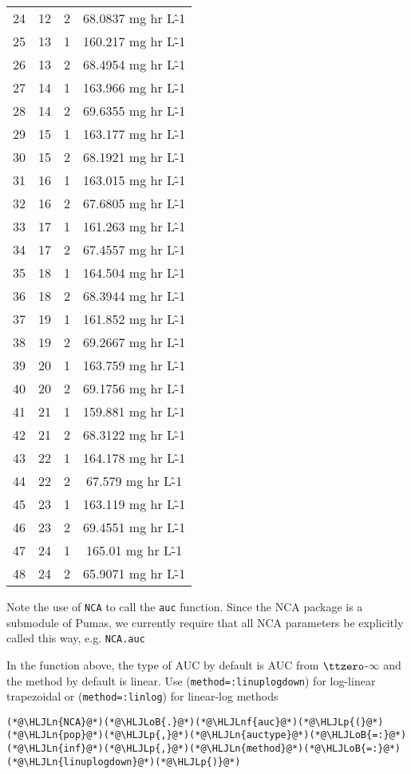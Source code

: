 \documentclass[12pt,a4paper]{article}
\newcommand{\HLJLn}[1]{#1}
\newcommand{\HLJLnf}[1]{\textcolor[RGB]{66,102,213}{#1}}
\newcommand{\HLJLoB}[1]{\textcolor[RGB]{102,102,102}{\textbf{#1}}}
\newcommand{\HLJLp}[1]{#1}
\begin{document}
\begin{tabular}{r|ccc}
	24 & 12 & 2 & 68.0837 mg hr L\^-1 \\
	25 & 13 & 1 & 160.217 mg hr L\^-1 \\
	26 & 13 & 2 & 68.4954 mg hr L\^-1 \\
	27 & 14 & 1 & 163.966 mg hr L\^-1 \\
	28 & 14 & 2 & 69.6355 mg hr L\^-1 \\
	29 & 15 & 1 & 163.177 mg hr L\^-1 \\
	30 & 15 & 2 & 68.1921 mg hr L\^-1 \\
	31 & 16 & 1 & 163.015 mg hr L\^-1 \\
	32 & 16 & 2 & 67.6805 mg hr L\^-1 \\
	33 & 17 & 1 & 161.263 mg hr L\^-1 \\
	34 & 17 & 2 & 67.4557 mg hr L\^-1 \\
	35 & 18 & 1 & 164.504 mg hr L\^-1 \\
	36 & 18 & 2 & 68.3944 mg hr L\^-1 \\
	37 & 19 & 1 & 161.852 mg hr L\^-1 \\
	38 & 19 & 2 & 69.2667 mg hr L\^-1 \\
	39 & 20 & 1 & 163.759 mg hr L\^-1 \\
	40 & 20 & 2 & 69.1756 mg hr L\^-1 \\
	41 & 21 & 1 & 159.881 mg hr L\^-1 \\
	42 & 21 & 2 & 68.3122 mg hr L\^-1 \\
	43 & 22 & 1 & 164.178 mg hr L\^-1 \\
	44 & 22 & 2 & 67.579 mg hr L\^-1 \\
	45 & 23 & 1 & 163.119 mg hr L\^-1 \\
	46 & 23 & 2 & 69.4551 mg hr L\^-1 \\
	47 & 24 & 1 & 165.01 mg hr L\^-1 \\
	48 & 24 & 2 & 65.9071 mg hr L\^-1 \\
\end{tabular}


Note the use of \texttt{NCA} to call the \texttt{auc} function. Since the NCA package is a submodule of Pumas, we currently require that all NCA parameters be explicitly called this way, e.g. \texttt{NCA.auc}

In the function above, the type of AUC by default is AUC from \ensuremath{\ttzero}-\ensuremath{\infty} and the method by default is linear. Use (\texttt{method=:linuplogdown}) for log-linear trapezoidal  or (\texttt{method=:linlog}) for linear-log methods


\begin{lstlisting}
(*@\HLJLn{NCA}@*)(*@\HLJLoB{.}@*)(*@\HLJLnf{auc}@*)(*@\HLJLp{(}@*)(*@\HLJLn{pop}@*)(*@\HLJLp{,}@*)(*@\HLJLn{auctype}@*)(*@\HLJLoB{=:}@*)(*@\HLJLn{inf}@*)(*@\HLJLp{,}@*)(*@\HLJLn{method}@*)(*@\HLJLoB{=:}@*)(*@\HLJLn{linuplogdown}@*)(*@\HLJLp{)}@*)
\end{lstlisting}
\end{document}
